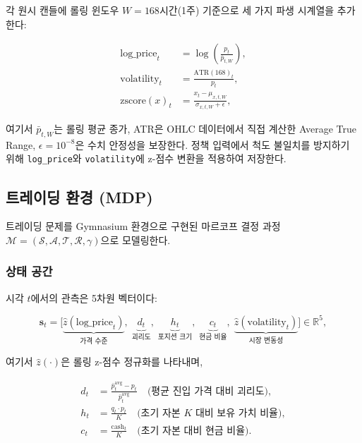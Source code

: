 \documentclass[11pt, a4paper]{article}
\begin{document}
각 원시 캔들에 롤링 윈도우 $W = 168$시간(1주) 기준으로 세 가지 파생 시계열을
추가한다:

\begin{align}
    \text{log\_price}_t &= \log\!\left(\frac{p_t}{\bar{p}_{t,W}}\right), \\
    \text{volatility}_t &= \frac{\text{ATR}(168)_t}{p_t}, \\
    \text{zscore}(x)_t  &= \frac{x_t - \mu_{x,t,W}}{\sigma_{x,t,W} + \epsilon},
\end{align}

여기서 $\bar{p}_{t,W}$는 롤링 평균 종가, ATR은 OHLC 데이터에서 직접 계산한
Average True Range, $\epsilon = 10^{-8}$은 수치 안정성을 보장한다.
정책 입력에서 척도 불일치를 방지하기 위해 \texttt{log\_price}와
\texttt{volatility}에 z-점수 변환을 적용하여 저장한다.

\subsection{트레이딩 환경 (MDP)}

트레이딩 문제를 Gymnasium 환경으로 구현된 마르코프 결정 과정
$\mathcal{M} = (\mathcal{S}, \mathcal{A}, \mathcal{T}, \mathcal{R}, \gamma)$으로 모델링한다.

\subsubsection*{상태 공간}

시각 $t$에서의 관측은 5차원 벡터이다:

\begin{equation}
    \bm{s}_t = \bigl[
        \underbrace{\hat{z}(\text{log\_price}_t)}_{\text{가격 수준}},\;
        \underbrace{d_t}_{\text{괴리도}},\;
        \underbrace{h_t}_{\text{포지션 크기}},\;
        \underbrace{c_t}_{\text{현금 비율}},\;
        \underbrace{\hat{z}(\text{volatility}_t)}_{\text{시장 변동성}}
    \bigr] \in \mathbb{R}^5,
\end{equation}

여기서 $\hat{z}(\cdot)$은 롤링 z-점수 정규화를 나타내며,

\begin{align}
    d_t &= \frac{\bar{p}^\text{avg}_t - p_t}{\bar{p}^\text{avg}_t}
           \quad \text{(평균 진입 가격 대비 괴리도)}, \\
    h_t &= \frac{q_t \cdot p_t}{K}
           \quad \text{(초기 자본 $K$ 대비 보유 가치 비율)}, \\
    c_t &= \frac{\text{cash}_t}{K}
           \quad \text{(초기 자본 대비 현금 비율)}.
\end{align}
\end{document}

